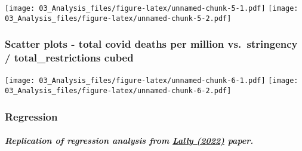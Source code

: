 \documentclass[
]{article}
\begin{document}
\texttt{[image: 03\_Analysis\_files/figure-latex/unnamed-chunk-5-1.pdf]}
\texttt{[image: 03\_Analysis\_files/figure-latex/unnamed-chunk-5-2.pdf]}

\hypertarget{scatter-plots---total-covid-deaths-per-million-vs.-stringency-total_restrictions-cubed}{%
\subsubsection{Scatter plots - total covid deaths per million
vs.~stringency / total\_restrictions
cubed}\label{scatter-plots---total-covid-deaths-per-million-vs.-stringency-total_restrictions-cubed}}

\texttt{[image: 03\_Analysis\_files/figure-latex/unnamed-chunk-6-1.pdf]}
\texttt{[image: 03\_Analysis\_files/figure-latex/unnamed-chunk-6-2.pdf]}

\hypertarget{regression}{%
\subsubsection{Regression}\label{regression}}

\hypertarget{replication-of-regression-analysis-from-lally-2022-paper.}{%
\subparagraph{\texorpdfstring{Replication of regression analysis from
\href{https://link.springer.com/content/pdf/10.1007/s40592-021-00148-y.pdf}{Lally
(2022)}
paper.}{Replication of regression analysis from Lally (2022) paper.}}\label{replication-of-regression-analysis-from-lally-2022-paper.}}
\end{document}

